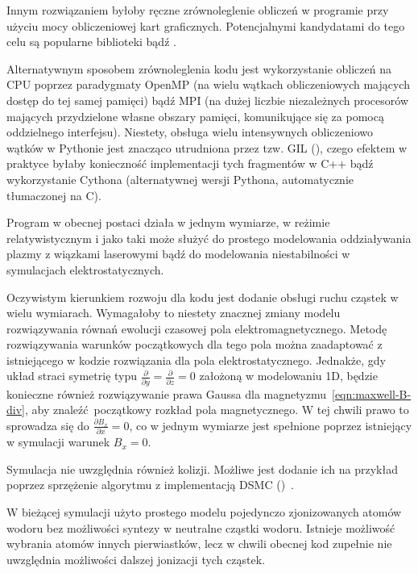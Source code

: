 Innym rozwiązaniem byłoby ręczne zrównoleglenie obliczeń w programie przy użyciu mocy obliczeniowej kart graficznych. Potencjalnymi kandydatami do tego celu są popularne biblioteki  bądź .

Alternatywnym sposobem zrównoleglenia kodu jest wykorzystanie obliczeń na CPU poprzez paradygmaty OpenMP (na wielu wątkach obliczeniowych mających dostęp do tej samej pamięci)
bądź MPI (na dużej liczbie niezależnych procesorów mających przydzielone własne obszary pamięci, komunikujące się za pomocą oddzielnego interfejsu). Niestety, obsługa wielu intensywnych obliczeniowo wątków w Pythonie
jest znacząco utrudniona przez tzw. GIL (), czego efektem w praktyce byłaby konieczność implementacji tych fragmentów w C++ bądź wykorzystanie Cythona (alternatywnej wersji Pythona, automatycznie tłumaczonej na C).

Program w obecnej postaci działa w jednym wymiarze, w reżimie relatywistycznym i jako taki może służyć do prostego modelowania oddziaływania plazmy z wiązkami laserowymi
bądź do modelowania niestabilności w symulacjach elektrostatycznych.

Oczywistym kierunkiem rozwoju dla kodu jest dodanie obsługi ruchu cząstek w wielu wymiarach. Wymagałoby to niestety znacznej zmiany modelu rozwiązywania równań ewolucji czasowej pola elektromagnetycznego.
Metodę rozwiązywania warunków początkowych dla tego pola można zaadaptować z istniejącego w kodzie rozwiązania dla pola elektrostatycznego. Jednakże, gdy układ straci symetrię typu
$\frac{\partial}{\partial y} = \frac{\partial}{\partial z} = 0$ założoną w modelowaniu 1D, będzie konieczne również rozwiązywanie
prawa Gaussa dla magnetyzmu~\ref{eqn:maxwell-B-div}, aby znaleźć początkowy rozkład pola magnetycznego. W tej chwili prawo to sprowadza się do $\frac{\partial B_x}{\partial x} = 0$, co
w jednym wymiarze jest spełnione poprzez istniejący w symulacji warunek $B_x = 0$.

Symulacja nie uwzględnia również kolizji. Możliwe jest dodanie ich na przykład poprzez sprzężenie algorytmu z implementacją DSMC ()~\cite{particleincell-dmsc}.

W bieżącej symulacji użyto prostego modelu pojedynczo zjonizowanych atomów wodoru bez możliwości syntezy w neutralne cząstki wodoru. Istnieje możliwość wybrania atomów innych pierwiastków,
lecz w chwili obecnej kod zupełnie nie uwzględnia możliwości dalszej jonizacji tych cząstek.
